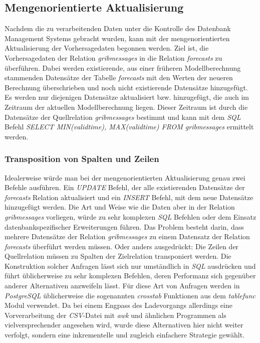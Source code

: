 \subsection{Mengenorientierte Aktualisierung}
Nachdem die zu verarbeitenden Daten unter die Kontrolle des Datenbank
Management Systems gebracht wurden, kann mit der mengenorientierten
Aktualisierung der Vorhersagedaten begonnen werden. Ziel ist, die
Vorhersagedaten der Relation \textit{grib\textunderscore messages} in
die Relation \textit{forecasts} zu überführen. Dabei werden
existierende, aus einer früheren Modellberechnung stammenden
Datensätze der Tabelle \textit{forecasts} mit den Werten der neueren
Berechnung überschrieben und noch nicht existierende Datensätze
hinzugefügt. Es werden nur diejenigen Datensätze aktualisiert bzw.
hinzugefügt, die auch im Zeitraum der aktuellen Modellberechnung
liegen. Dieser Zeitraum ist durch die Datensätze der Quellrelation
\textit{grib\textunderscore messages} bestimmt und kann mit dem
\textit{SQL} Befehl \textit{SELECT MIN(valid\textunderscore time),
  MAX(valid\textunderscore time) FROM grib\textunderscore messages}
ermittelt werden.

\subsubsection{Transposition von Spalten und Zeilen}
Idealerweise würde man bei der mengenorientierten Aktualisierung genau
zwei Befehle ausführen. Ein \textit{UPDATE} Befehl, der alle
existierenden Datensätze der \textit{forecasts} Relation aktualisiert
und ein \textit{INSERT} Befehl, mit dem neue Datensätze hinzugefügt
werden. Die Art und Weise wie die Daten aber in der Relation
\textit{grib\textunderscore messages} vorliegen, würde zu sehr
komplexen \textit{SQL} Befehlen oder dem Einsatz datenbankspezifischer
Erweiterungen führen. Das Problem besteht darin, dass mehrere
Datensätze der Relation \textit{grib\textunderscore messages} zu einem
Datensatz der Relation \textit{forecasts} überführt werden
müssen. Oder anders ausgedrückt: Die Zeilen der Quellrelation müssen
zu Spalten der Zielrelation transponiert werden. Die Konstruktion
solcher Anfragen lässt sich nur umständlich in \textit{SQL} ausdrücken
und führt üblicherweise zu sehr komplexen Befehlen, deren Performanz
sich gegenüber anderer Alternativen anzweifeln lässt. Für diese Art
von Anfragen werden in \textit{PostgreSQL} üblicherweise die
sogenannten \textit{crosstab} Funktionen aus dem \textit{tablefunc}
Modul verwendet. Da bei einem Engpass des Ladevorgangs allerdings eine
Vorverarbeitung der \textit{CSV}-Datei mit \textit{awk} und ähnlichen
Programmen als vielversprechender angesehen wird, wurde diese
Alternativen hier nicht weiter verfolgt, sondern eine inkrementelle
und zugleich einfachere Strategie gewählt.

